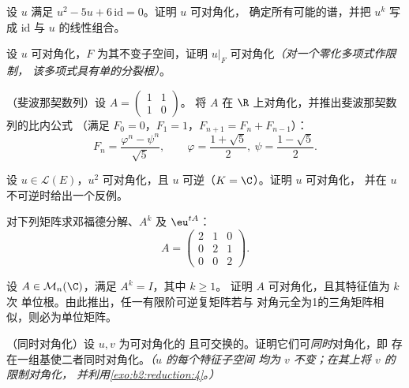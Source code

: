 \begin{exercise}[$\star$]\label{exo:b2:reduction:3}
设 $u$ 满足 $u^2 - 5u + 6\,\mathrm{id} = 0$。证明 $u$ 可对角化，
确定所有可能的谱，并把 $u^k$
写成 $\mathrm{id}$ 与 $u$ 的线性组合。
\end{exercise}

\begin{exercise}[$\star\star$]\label{exo:b2:reduction:4}
设 $u$ 可对角化，$F$ 为其不变子空间，证明
$u|_F$ 可对角化\emph{（对一个零化多项式作限制，
该多项式具有单的分裂根）}。
\end{exercise}

\begin{exercise}[$\star\star$]\label{exo:b2:reduction:5}
（斐波那契数列）设 $A = \begin{pmatrix} 1 & 1\\ 1 & 0\end{pmatrix}$。
将 $A$ 在 $\R$ 上对角化，并推出斐波那契数列的比内公式
（满足 $F_0 = 0$，$F_1 = 1$，$F_{n+1} = F_n +
F_{n-1}$）：
\[
F_n = \frac{\varphi^n - \psi^n}{\sqrt 5},
\qquad \varphi = \frac{1 + \sqrt5}{2},\ \psi = \frac{1 -
\sqrt5}{2}.
\]
\end{exercise}

\begin{exercise}[$\star\star$]\label{exo:b2:reduction:6}
设 $u \in \mathcal{L}(E)$，$u^2$ 可对角化，且 $u$
可逆（$K = \C$）。证明 $u$ 可对角化，
并在 $u$ 不可逆时给出一个反例。
\end{exercise}

\begin{exercise}[$\star\star$]\label{exo:b2:reduction:7}
对下列矩阵求邓福德分解、$A^k$ 及 $\eu^{tA}$：
\[
A = \begin{pmatrix} 2 & 1 & 0\\ 0 & 2 & 1\\ 0 & 0 & 2
\end{pmatrix}.
\]
\end{exercise}

\begin{exercise}[$\star\star$]\label{exo:b2:reduction:8}
设 $A \in \mathcal{M}_n(\C)$，满足 $A^k = I$，其中 $k \geq 1$。
证明 $A$ 可对角化，且其特征值为 $k$ 次
单位根。由此推出，任一有限阶可逆复矩阵若与
对角元全为1的三角矩阵相似，则必为单位矩阵。
\end{exercise}

\begin{exercise}[$\star\star\star$]\label{exo:b2:reduction:9}
（同时对角化）设 $u, v$ 为可对角化的
且可交换的。证明它们可\emph{同时}对角化，即
存在一组基使二者同时对角化。\emph{（$u$ 的每个特征子空间
均为 $v$ 不变；在其上将 $v$ 的限制对角化，
并利用\cref{exo:b2:reduction:4}。）}
\end{exercise}

